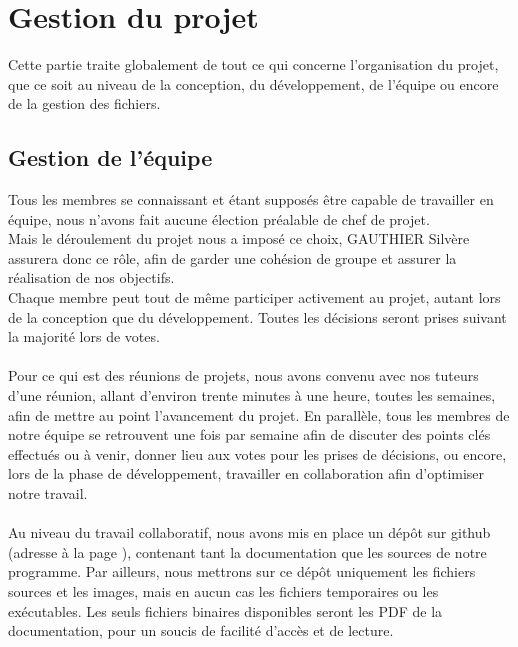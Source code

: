 \documentclass[a4paper]{memoir}
\begin{document}
	\chapter{Gestion du projet}
		Cette partie traite globalement de tout ce qui concerne l'organisation du projet, que ce soit au niveau de la conception, du développement, de 
		l'équipe ou encore de la gestion des fichiers.
		
		\section{Gestion de l'équipe}
			Tous les membres se connaissant et étant supposés être capable de travailler en équipe, nous n'avons fait aucune élection préalable de chef de 
			projet.\\ Mais le déroulement du projet nous a imposé ce choix, GAUTHIER Silvère assurera donc ce rôle, afin de garder une cohésion de groupe 
			et assurer la réalisation de nos objectifs.\\ Chaque membre peut tout de même participer activement au projet, autant lors de la conception que 
			du développement. Toutes les décisions seront prises suivant la majorité lors de votes.\\\\
			Pour ce qui est des réunions de projets, nous avons convenu avec nos tuteurs d'une réunion, allant d'environ trente minutes à une heure, toutes 
			les semaines, afin de mettre au point l'avancement du projet. En parallèle, tous les membres de notre équipe se retrouvent une fois par semaine 
			afin de discuter des points clés effectués ou à venir, donner lieu aux votes pour les prises de décisions, ou encore, lors de la phase de 
			développement, travailler en collaboration afin d'optimiser notre travail.\\\\
			Au niveau du travail collaboratif, nous avons mis en place un dépôt sur github (adresse à la page \pageref{url:github}), contenant tant la 
			documentation que les sources de notre programme. Par ailleurs, nous mettrons sur ce dépôt uniquement les fichiers sources et les images, mais 
			en aucun cas les fichiers temporaires ou les exécutables. Les seuls fichiers binaires disponibles seront les PDF de la documentation, pour un 
			soucis de facilité d'accès et de lecture.
\end{document}
